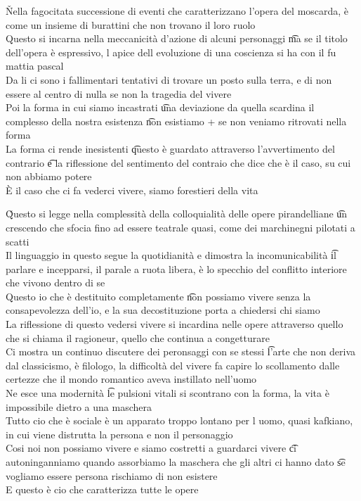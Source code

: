 \documentclass[12pt]{article}
\begin{document}
\v

Nella fagocitata successione di eventi che caratterizzano l'opera del moscarda, è come un insieme di burattini che non trovano il loro ruolo \\
Questo si incarna nella meccanicità d'azione di alcuni personaggi \t ma se il titolo dell'opera è espressivo, l apice dell evoluzione di una coscienza si ha con il fu mattia pascal \\
Da li ci sono i fallimentari tentativi di trovare un posto sulla terra, e di non essere al centro di nulla se non la tragedia del vivere \\
Poi la forma in cui siamo incastrati \t una deviazione da quella scardina il complesso della nostra esistenza \t non esistiamo + se non veniamo ritrovati nella forma \\
La forma ci rende inesistenti \t questo è guardato attraverso l'avvertimento del contrario \t e la riflessione del sentimento del contraio che dice che è il caso, su cui non abbiamo potere \\
È il caso che ci fa vederci vivere, siamo forestieri della vita

\v

Questo si legge nella complessità della colloquialità delle opere pirandelliane \t un crescendo che sfocia fino ad essere teatrale quasi, come dei marchinegni pilotati a scatti \\
Il linguaggio in questo segue la quotidianità e dimostra la incomunicabilità \t il parlare e incepparsi, il parale a ruota libera, è lo specchio del conflitto interiore che vivono dentro di se \\
Questo io che è destituito completamente \t non possiamo vivere senza la consapevolezza dell'io, e la sua decostituzione porta a chiedersi chi siamo \\
La riflessione di questo vedersi vivere si incardina nelle opere attraverso quello che si chiama il ragioneur, quello che continua a congetturare \\
Ci mostra un continuo discutere dei peronsaggi con se stessi \t l'arte che non deriva dal classicismo, è filologo, la difficoltà del vivere fa capire lo scollamento dalle certezze che il mondo romantico aveva instillato nell'uomo \\
Ne esce una modernità \t le pulsioni vitali si scontrano con la forma, la vita è impossibile dietro a una maschera \\
Tutto cio che è sociale è un apparato troppo lontano per l uomo, quasi kafkiano, in cui viene distrutta la persona e non il personaggio \\
Cosi noi non possiamo vivere e siamo costretti a guardarci vivere \t ci autoninganniamo quando assorbiamo la maschera che gli altri ci hanno dato \t se vogliamo essere persona rischiamo di non esistere \\
E questo è cio che caratterizza tutte le opere
\end{document}
